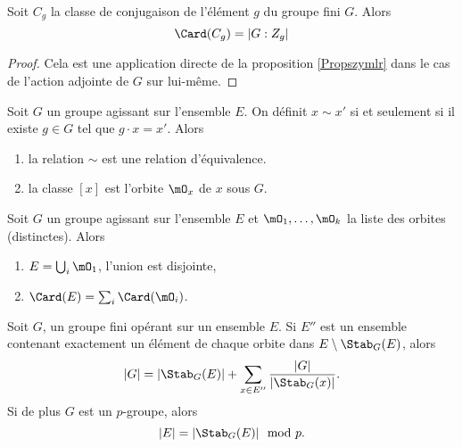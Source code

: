 \begin{corollary}
    Soit \( C_g\) la classe de conjugaison de l'élément  \( g\) du groupe fini \( G\). Alors
    \begin{equation}
        \Card(C_g)=| G:Z_g |
    \end{equation}
\end{corollary}

\begin{proof}
    Cela est une application directe de la proposition \ref{Propszymlr} dans le cas de l'action adjointe de \( G\) sur lui-même.
\end{proof}

\begin{lemma}
    Soit \( G\) un groupe agissant sur l'ensemble \( E\). On définit \( x\sim x'\) si et seulement si il existe \( g\in G\) tel que \( g\cdot x=x'\). Alors
    \begin{enumerate}
        \item
            la relation \( \sim\) est une relation d'équivalence.
        \item
            la classe \( [x]\) est l'orbite \( \mO_x\) de \( x\) sous \( G\).
    \end{enumerate}
\end{lemma}

\begin{corollary} \label{CorARFVMP}
    Soit \( G\) un groupe agissant sur l'ensemble \( E\) et \( \mO_1,\ldots, \mO_k  \) la liste des orbites (distinctes). Alors
    \begin{enumerate}
        \item
            \( E=\bigcup_i\mO_1\), l'union est disjointe,
        \item
            \( \Card(E)=\sum_i\Card(\mO_i)\).
    \end{enumerate}
\end{corollary}

\begin{proposition}     \label{PropUyLPdp}
    Soit \( G\), un groupe fini opérant sur un ensemble \( E\). Si \( E''\) est un ensemble contenant exactement un élément de chaque orbite dans \( E\setminus\Stab_G(E)\), alors
    \begin{equation}        \label{EqobuzfK}
        | G |=| \Stab_G(E) |+\sum_{x\in E''}\frac{ | G | }{ | \Stab_G(x) | }.
    \end{equation}
    Si de plus \( G\) est un $p$-groupe, alors 
    \begin{equation}    \label{EqbzLEVJ}
        | E |=| \Stab_G(E) |\mod p.
    \end{equation}
\end{proposition}

